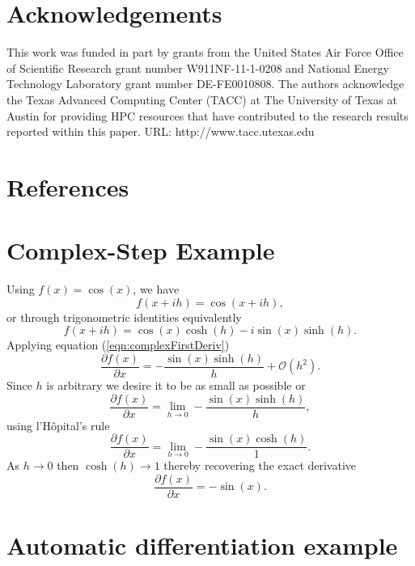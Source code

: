 \documentclass[preprint,12pt]{elsarticle}
\begin{document}
\section{Acknowledgements}
\label{sec:ack}
This work was funded in part by grants from the United States Air Force Office of Scientific Research grant number W911NF-11-1-0208 and National Energy Technology Laboratory grant number DE-FE0010808. The authors acknowledge the Texas Advanced Computing Center (TACC) at The University of Texas at Austin for providing HPC resources that have contributed to the research results reported within this paper. URL: http://www.tacc.utexas.edu


\section{References}




\appendix
\renewcommand*{\thesection}{\Alph{section}}
%
\section{Complex-Step Example}
\label{sec:appendixA}
%
Using $f(x) = \cos(x)$, we have
%
\[
f (x + i h) = \cos(x + i h),
\]
%
or through trigonometric identities equivalently
%
\[
f(x + i h) = \cos(x) \cosh(h) - i \sin(x) \sinh(h).
\]
%
Applying equation (\ref{eqn:complexFirstDeriv})
\[
    \frac{\partial f(x)}{\partial x} = - \frac{\sin(x) \sinh(h)}{h} + \mathcal{O}(h^2).
\]
Since $h$ is arbitrary we desire it to be as small as possible or
\[
\frac{\partial f(x)}{\partial x} = \lim_{h \to 0} - \frac{\sin(x) \sinh(h)}{h},
\]
using l'H\^opital's rule
\[
\frac{\partial f(x)}{\partial x} = \lim_{h \to 0} - \frac{\sin(x) \cosh(h)}{1}.
\]
As $h \to 0$ then $\cosh(h) \to 1$ thereby recovering the exact derivative
\[
\frac{\partial f(x)}{\partial x} =-\sin(x).
\]

\section{Automatic differentiation example}
\label{sec:appendixB}
\end{document}
